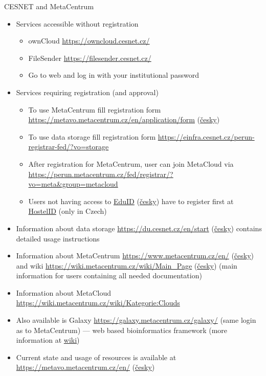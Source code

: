 \documentclass[compress, ucs, xelatex, 11pt, xcolor=svgnames, aspectratio=169,
	hyperref={
		bookmarks=true,
		unicode=true,
		colorlinks=true,
		pdftitle={Linux, command line and MetaCentrum},
		plainpages=false,
		pdfauthor={Vojtech Zeisek},
		pdfsubject={Course about use of Linux command line, writing shell scripts and using MetaCentrum of CESNET},
		pdfcreator={XeLaTeX},
		pdfkeywords={Linux, GNU, BASH, shell, command line, MetaCentrum},
		linkcolor=DarkRed, %
		anchorcolor=DarkBlue, %
		citecolor=Indigo, %
		filecolor=NavyBlue, %
		menucolor=DarkMagenta, %
		urlcolor=DarkBlue, %
		pdftex},
	url={hyphens, lowtilde} %
	]{beamer}
\begin{document}
\begin{frame}[allowframebreaks]{CESNET and MetaCentrum}
\begin{itemize}
\begin{itemize}
		\end{itemize}
		\item Services accessible without registration
		\begin{itemize}
			\item ownCloud \url{https://owncloud.cesnet.cz/}
			\item FileSender \url{https://filesender.cesnet.cz/}
			\item Go to web and log in with your institutional password
		\end{itemize}
		\item Services requiring registration (and approval)
		\begin{itemize}
			\item To use MetaCentrum fill registration form \url{https://metavo.metacentrum.cz/en/application/form} (\href{https://metavo.metacentrum.cz/cs/application/}{česky})
			\item To use data storage fill registration form \url{https://einfra.cesnet.cz/perun-registrar-fed/?vo=storage}
			\item After registration for MetaCentrum, user can join MetaCloud via \url{https://perun.metacentrum.cz/fed/registrar/?vo=meta&group=metacloud}
			\item Users not having access to \href{https://www.eduid.cz/en/index}{EduID} (\href{https://www.eduid.cz/cs/index}{česky}) have to register first at \href{https://www.eduid.cz/cs/hostel}{HostelID} (only in Czech)
		\end{itemize}
		\item Information about data storage \url{https://du.cesnet.cz/en/start} (\href{https://du.cesnet.cz/cs/start}{česky}) contains detailed usage instructions
		\item Information about MetaCentrum \url{https://www.metacentrum.cz/en/} (\href{https://www.metacentrum.cz/cs/}{česky}) and wiki \url{https://wiki.metacentrum.cz/wiki/Main_Page} (\href{https://wiki.metacentrum.cz/wiki/Hlavn\%C3\%AD_strana}{česky}) (main information for users containing all needed documentation)
		\item Information about MetaCloud \url{https://wiki.metacentrum.cz/wiki/Kategorie:Clouds}
		\item Also available is Galaxy \url{https://galaxy.metacentrum.cz/galaxy/} (same login as to MetaCentrum) --- web based bioinformatics framework (more information at \href{https://wiki.metacentrum.cz/wiki/Galaxy}{wiki})
		\item Current state and usage of resources is available at \url{https://metavo.metacentrum.cz/en/} (\href{https://metavo.metacentrum.cz/cs/}{česky})

\end{itemize}
\end{frame}
\end{document}
